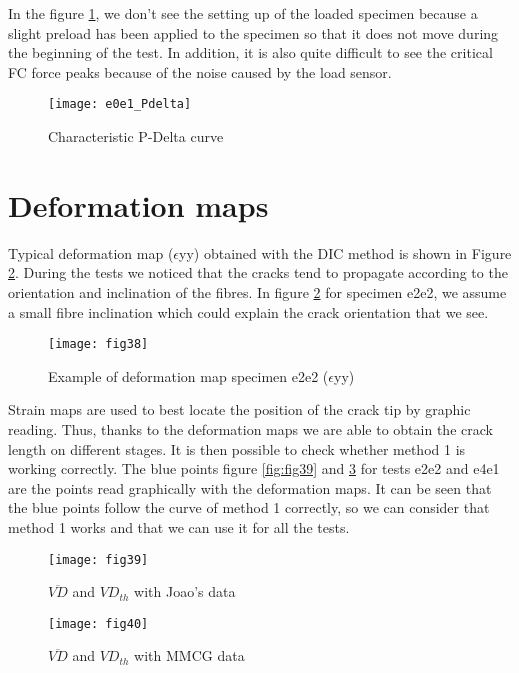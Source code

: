  In the figure \ref{fig:e0e1_Pdelta}, we don't see the setting up of the loaded specimen because a slight preload has been applied to the specimen so that it does not move during the beginning of the test. In addition, it is also quite difficult to see the critical FC force peaks because of the noise caused by the load sensor.

\begin{figure}[htp]
	\centering
	\texttt{[image: e0e1\_Pdelta]}
	\caption{Characteristic P-Delta curve}
	\label{fig:e0e1_Pdelta}
\end{figure}


\section{Deformation maps}

Typical deformation map ($\epsilon$yy) obtained with the DIC method is shown in Figure \ref{fig:fig38}.
During the tests we noticed that the cracks tend to propagate according to the orientation and inclination of the fibres.
In figure \ref{fig:fig38} for specimen e2e2, we assume a small fibre inclination which could explain the crack orientation that we see.

\begin{figure}[htp]
	\centering
	\texttt{[image: fig38]}
	\caption{Example of deformation map specimen e2e2 ($\epsilon$yy)}
	\label{fig:fig38}
\end{figure}

Strain maps are used to best locate the position of the crack tip by graphic reading.
Thus, thanks to the deformation maps we are able to obtain the crack length on different stages. It is then possible to check whether method 1 is working correctly.
The blue points figure \ref{fig:fig39} and \ref{fig:fig40} for tests e2e2 and e4e1 are the points read graphically with the deformation maps. It can be seen that the blue points follow the curve of method 1 correctly, so we can consider that method 1 works and that we can use it for all the tests.

\begin{figure}[htp]
	\begin{minipage}[c]{.46\linewidth}
		\centering
		\texttt{[image: fig39]}
		\caption{$\overline{VD}$ and $VD_{th}$ with Joao's data}
		\label{fig:fig39}
	\end{minipage}
	\hfill%
	\begin{minipage}[c]{.46\linewidth}
		\centering
		\texttt{[image: fig40]}
		\caption{$\overline{VD}$ and $VD_{th}$ with MMCG data}
		\label{fig:fig40}
	\end{minipage}
\end{figure}


